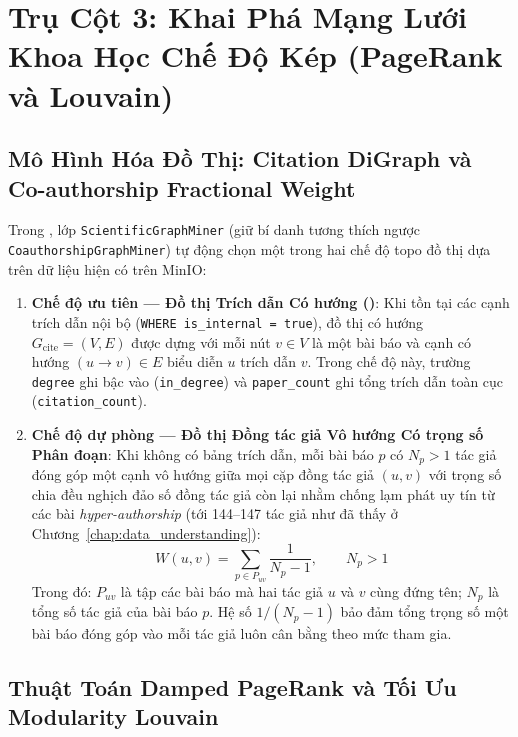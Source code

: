 \section{Trụ Cột 3: Khai Phá Mạng Lưới Khoa Học Chế Độ Kép (PageRank và Louvain)}
\label{sec:ch4_graph}

\subsection{Mô Hình Hóa Đồ Thị: Citation DiGraph và Co-authorship Fractional Weight}
\label{sec:ch4_graph_modes}

Trong , lớp \texttt{ScientificGraphMiner} (giữ bí danh tương thích ngược \texttt{CoauthorshipGraphMiner}) tự động chọn một trong hai chế độ topo đồ thị dựa trên dữ liệu hiện có trên MinIO:
\begin{enumerate}[label=\textbf{\arabic*.}]
  \item \textbf{Chế độ ưu tiên --- Đồ thị Trích dẫn Có hướng ()}: Khi tồn tại các cạnh trích dẫn nội bộ (\texttt{WHERE is\_internal = true}), đồ thị có hướng $G_{\text{cite}} = (V, E)$ được dựng với mỗi nút $v \in V$ là một bài báo và cạnh có hướng $(u \rightarrow v) \in E$ biểu diễn $u$ trích dẫn $v$. Trong chế độ này, trường \texttt{degree} ghi bậc vào (\texttt{in\_degree}) và \texttt{paper\_count} ghi tổng trích dẫn toàn cục (\texttt{citation\_count}).
  \item \textbf{Chế độ dự phòng --- Đồ thị Đồng tác giả Vô hướng Có trọng số Phân đoạn}: Khi không có bảng trích dẫn, mỗi bài báo $p$ có $N_p > 1$ tác giả đóng góp một cạnh vô hướng giữa mọi cặp đồng tác giả $(u, v)$ với trọng số chia đều nghịch đảo số đồng tác giả còn lại nhằm chống lạm phát uy tín từ các bài \textit{hyper-authorship} (tới 144--147 tác giả như đã thấy ở Chương~\ref{chap:data_understanding}):
  \begin{equation}
    W(u, v) = \sum_{p \in P_{uv}} \frac{1}{N_p - 1}, \qquad N_p > 1
    \label{eq:ch4_fractional_weight}
  \end{equation}
  Trong đó: $P_{uv}$ là tập các bài báo mà hai tác giả $u$ và $v$ cùng đứng tên; $N_p$ là tổng số tác giả của bài báo $p$. Hệ số $1/(N_p - 1)$ bảo đảm tổng trọng số một bài báo đóng góp vào mỗi tác giả luôn cân bằng theo mức tham gia.
\end{enumerate}

\subsection{Thuật Toán Damped PageRank và Tối Ưu Modularity Louvain}
\label{sec:ch4_pagerank_louvain}

